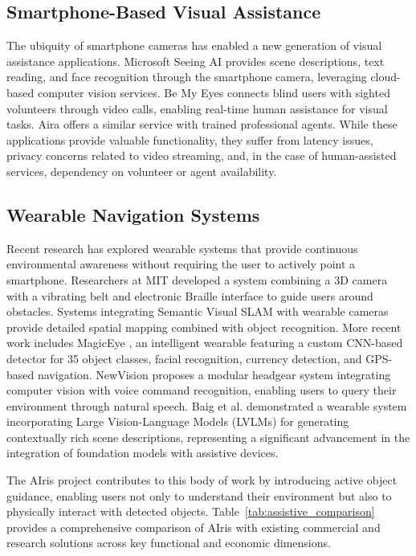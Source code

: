 \documentclass[12pt,a4paper]{report}
\begin{document}
\subsection{Smartphone-Based Visual Assistance}

The ubiquity of smartphone cameras has enabled a new generation of visual assistance applications. Microsoft Seeing AI \cite{seeingai} provides scene descriptions, text reading, and face recognition through the smartphone camera, leveraging cloud-based computer vision services. Be My Eyes \cite{bemyeyes} connects blind users with sighted volunteers through video calls, enabling real-time human assistance for visual tasks. Aira \cite{aira} offers a similar service with trained professional agents. While these applications provide valuable functionality, they suffer from latency issues, privacy concerns related to video streaming, and, in the case of human-assisted services, dependency on volunteer or agent availability.

\subsection{Wearable Navigation Systems}

Recent research has explored wearable systems that provide continuous environmental awareness without requiring the user to actively point a smartphone. Researchers at MIT \cite{mitwearable} developed a system combining a 3D camera with a vibrating belt and electronic Braille interface to guide users around obstacles. Systems integrating Semantic Visual SLAM with wearable cameras \cite{semanticslam} provide detailed spatial mapping combined with object recognition. More recent work includes MagicEye \cite{magiceye}, an intelligent wearable featuring a custom CNN-based detector for 35 object classes, facial recognition, currency detection, and GPS-based navigation. NewVision \cite{newvision} proposes a modular headgear system integrating computer vision with voice command recognition, enabling users to query their environment through natural speech. Baig et al. \cite{baig2024} demonstrated a wearable system incorporating Large Vision-Language Models (LVLMs) for generating contextually rich scene descriptions, representing a significant advancement in the integration of foundation models with assistive devices.

The AIris project contributes to this body of work by introducing active object guidance, enabling users not only to understand their environment but also to physically interact with detected objects. Table~\ref{tab:assistive_comparison} provides a comprehensive comparison of AIris with existing commercial and research solutions across key functional and economic dimensions.
\end{document}
